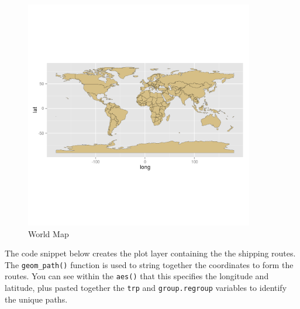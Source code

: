 \documentclass[]{article}
\newenvironment{Shaded}{}{}
\newcommand{\KeywordTok}[1]{\textcolor[rgb]{0.00,0.44,0.13}{\textbf{{#1}}}}
\newcommand{\DataTypeTok}[1]{\textcolor[rgb]{0.56,0.13,0.00}{{#1}}}
\newcommand{\FloatTok}[1]{\textcolor[rgb]{0.25,0.63,0.44}{{#1}}}
\newcommand{\StringTok}[1]{\textcolor[rgb]{0.25,0.44,0.63}{{#1}}}
\newcommand{\NormalTok}[1]{{#1}}
\let\Oldincludegraphics\includegraphics
\renewcommand{\includegraphics}[1]{\Oldincludegraphics[width=10cm]{#1}}
\begin{document}
\begin{figure}[htbp]
\centering
\includegraphics{figure/World_Map.png}
\caption{World Map}
\end{figure}

The code snippet below creates the plot layer containing the the
shipping routes. The \texttt{geom\_path()} function is used to string
together the coordinates to form the routes. You can see within the
\texttt{aes()} that this specifies the longitude and latitude, plus pasted
together the \texttt{trp} and \texttt{group.regroup} variables to
identify the unique paths.

\begin{Shaded}
\end{Shaded}
\end{document}
